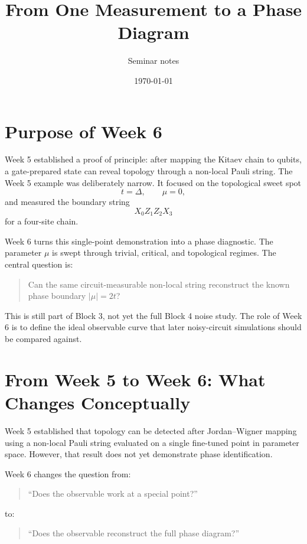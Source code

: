 \documentclass[11pt]{article}
\title{From One Measurement to a Phase Diagram}
\author{Seminar notes}
\date{\today}
\begin{document}
\maketitle

\section{Purpose of Week 6}

Week 5 established a proof of principle: after mapping the Kitaev chain to qubits, a gate-prepared state can reveal topology through a non-local Pauli string. The Week 5 example was deliberately narrow. It focused on the topological sweet spot
\begin{equation}
  t=\Delta, \qquad \mu=0,
\end{equation}
and measured the boundary string
\begin{equation}
  X_0 Z_1 Z_2 X_3
\end{equation}
for a four-site chain.

Week 6 turns this single-point demonstration into a phase diagnostic. The parameter $\mu$ is swept through trivial, critical, and topological regimes. The central question is:
\begin{quote}
  Can the same circuit-measurable non-local string reconstruct the known phase boundary $|\mu|=2t$?
\end{quote}

This is still part of Block 3, not yet the full Block 4 noise study. The role of Week 6 is to define the ideal observable curve that later noisy-circuit simulations should be compared against.
\section{From Week 5 to Week 6: What Changes Conceptually}

Week 5 established that topology can be detected after Jordan--Wigner mapping using a non-local Pauli string evaluated on a single fine-tuned point in parameter space. However, that result does not yet demonstrate phase identification.

Week 6 changes the question from:
\begin{quote}
``Does the observable work at a special point?''
\end{quote}
to:
\begin{quote}
``Does the observable reconstruct the full phase diagram?''
\end{quote}
\end{document}

